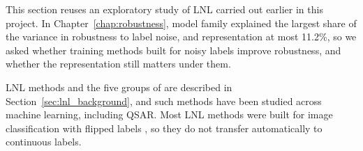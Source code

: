 %
%
This section reuses an exploratory study of LNL carried out earlier in this project. In Chapter~\ref{chap:robustness}, model family explained the largest share of the variance in robustness to label noise, and representation at most 11.2\%, so we asked whether training methods built for noisy labels improve robustness, and whether the representation still matters under them.

LNL methods and the five groups of \citet{Song2022} are described in Section~\ref{sec:lnl_background}, and such methods have been studied across machine learning, including QSAR. Most LNL methods were built for image classification with flipped labels \citep{Song2022}, so they do not transfer automatically to continuous labels.

